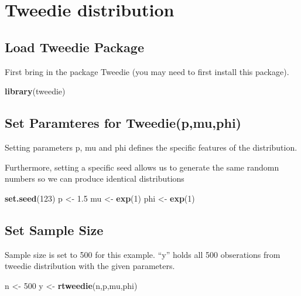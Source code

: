 \documentclass[]{book}
\newenvironment{Shaded}{\begin{snugshade}}{\end{snugshade}}
\newcommand{\KeywordTok}[1]{\textcolor[rgb]{0.13,0.29,0.53}{\textbf{#1}}}
\newcommand{\DecValTok}[1]{\textcolor[rgb]{0.00,0.00,0.81}{#1}}
\newcommand{\FloatTok}[1]{\textcolor[rgb]{0.00,0.00,0.81}{#1}}
\newcommand{\StringTok}[1]{\textcolor[rgb]{0.31,0.60,0.02}{#1}}
\newcommand{\NormalTok}[1]{#1}
\theoremstyle{definition}
\theoremstyle{definition}
\theoremstyle{definition}
\theoremstyle{remark}
\begin{document}
\section{Tweedie distribution}\label{tweedie-distribution}

\subsection{Load Tweedie Package}\label{load-tweedie-package}

First bring in the package Tweedie (you may need to first install this
package).

\begin{Shaded}
\begin{Highlighting}[]
\KeywordTok{library}\NormalTok{(tweedie)}
\end{Highlighting}
\end{Shaded}

\subsection{Set Paramteres for
Tweedie(p,mu,phi)}\label{set-paramteres-for-tweediepmuphi}

Setting parameters p, mu and phi defines the specific features of the
distribution.

Furthermore, setting a specific seed allows us to generate the same
randomn numbers so we can produce identical distributions

\begin{Shaded}
\begin{Highlighting}[]
\KeywordTok{set.seed}\NormalTok{(}\DecValTok{123}\NormalTok{)}
\NormalTok{p <-}\StringTok{ }\FloatTok{1.5}
\NormalTok{mu <-}\StringTok{ }\KeywordTok{exp}\NormalTok{(}\DecValTok{1}\NormalTok{) }
\NormalTok{phi <-}\StringTok{ }\KeywordTok{exp}\NormalTok{(}\DecValTok{1}\NormalTok{)}
\end{Highlighting}
\end{Shaded}

\subsection{Set Sample Size}\label{set-sample-size}

Sample size is set to 500 for this example. ``y'' holds all 500
obserations from tweedie distribution with the given parameters.

\begin{Shaded}
\begin{Highlighting}[]
\NormalTok{n <-}\StringTok{ }\DecValTok{500}
\NormalTok{y <-}\StringTok{ }\KeywordTok{rtweedie}\NormalTok{(n,p,mu,phi)}
\end{Highlighting}
\end{Shaded}
\end{document}
